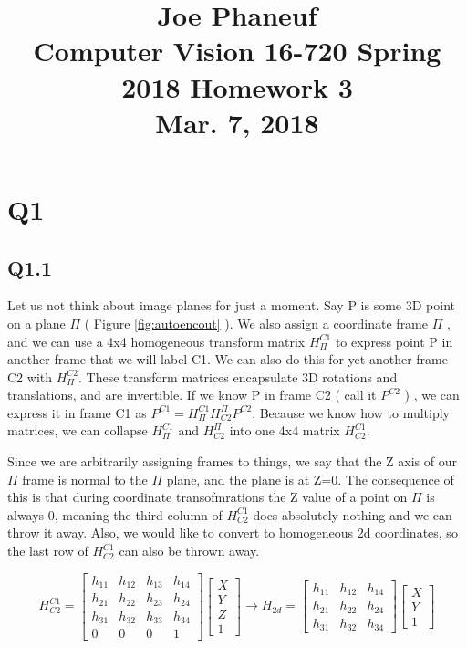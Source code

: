 \documentclass[12pt]{article}
\begin{document}
\title{Joe Phaneuf \\ Computer Vision 16-720 Spring 2018 Homework 3 \\ Mar. 7, 2018 }
\date{}
\author{}
\maketitle

\newpage


\section{Q1}
\subsection{Q1.1}
Let us not think about image planes for just a moment. Say P is some 3D point on a plane $\Pi$ ( Figure \ref{fig:autoencout} ). We also assign a coordinate frame $\Pi$ , and we can use a 4x4 homogeneous transform matrix $H_{\Pi}^{C1}$ to express point P in another frame that we will label C1. We can also do this for yet another frame C2 with $H_{\Pi}^{C2}$. These transform matrices encapsulate 3D rotations and translations, and are invertible. If we know P in frame C2 ( call it $P^{C2}$ ) , we can express it in frame C1 as $P^{C1} = H_{\Pi}^{C1} H_{C2}^{\Pi} P^{C2}$. Because we know how to multiply matrices, we can collapse $H_{\Pi}^{C1}$ and  $H_{C2}^{\Pi}$ into one 4x4 matrix $H_{C2}^{C1}$.

Since we are arbitrarily assigning frames to things, we say that the Z axis of our $\Pi$ frame is normal to the $\Pi$ plane, and the plane is at Z=0. The consequence of this is that during coordinate transofmrations the Z value of a point on $\Pi$ is always 0, meaning the third column of $H_{C2}^{C1}$ does absolutely nothing and we can throw it away. Also, we would like to convert to homogeneous 2d coordinates, so the last row of $H_{C2}^{C1}$ can also be thrown away.

$$
H_{C2}^{C1}=
\begin{bmatrix}
h_{11} & h_{12} & h_{13} & h_{14} \\
h_{21} & h_{22} & h_{23} & h_{24} \\
h_{31} & h_{32} & h_{33} & h_{34} \\
0 & 0 & 0 & 1
\end{bmatrix}
\begin{bmatrix}
X \\ Y \\ Z \\ 1
\end{bmatrix}
\rightarrow
H_{2d}=
\begin{bmatrix}
h_{11} & h_{12} & h_{14} \\
h_{21} & h_{22} & h_{24} \\
h_{31} & h_{32} & h_{34} 
\end{bmatrix}
\begin{bmatrix}
X \\ Y  \\ 1
\end{bmatrix}
$$
\end{document}
